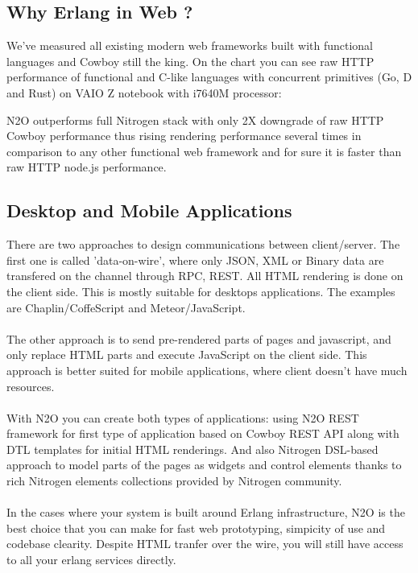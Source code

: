 \documentclass[11pt]{article}
\begin{document}
\subsection*{Why Erlang in Web ?}
We've measured all existing modern web frameworks built with functional languages and Cowboy still the king.
On the chart you can see raw HTTP performance of functional and C-like languages with concurrent primitives (Go, D and Rust)
on VAIO Z notebook with i7640M processor:


N2O outperforms full Nitrogen stack with only 2X downgrade of raw HTTP Cowboy
performance thus rising rendering performance several times in comparison to
any other functional web framework and for sure it is faster than raw HTTP node.js performance.

\subsection*{Desktop and Mobile Applications}
There are two approaches to design communications between client/server.
The first one is called 'data-on-wire', where only JSON, XML or Binary
data are transfered on the channel through RPC, REST. All HTML rendering
is done on the client side. This is mostly suitable for desktops
applications. The examples are Chaplin/CoffeScript and Meteor/JavaScript.
\paragraph{}
The other approach is to send pre-rendered parts of pages and javascript,
and only replace HTML parts and execute JavaScript on the client side. This approach
is better suited for mobile applications, where client doesn't have much resources.
\paragraph{}
With N2O you can create both types of applications: using N2O REST framework
for first type of application based on Cowboy REST API along with DTL
templates for initial HTML renderings. And also Nitrogen DSL-based approach
to model parts of the pages as widgets and control elements thanks to rich
Nitrogen elements collections provided by Nitrogen community.
\paragraph{}
In the cases where your system is built around Erlang infrastructure, N2O
is the best choice that you can make for fast web prototyping, simpicity
of use and codebase clearity. Despite HTML tranfer over the wire,
you will still have access to all your erlang services directly.
\end{document}
